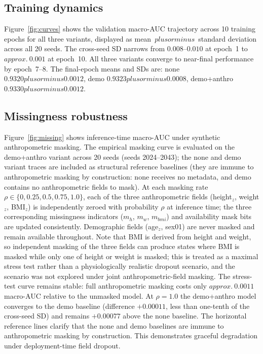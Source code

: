\documentclass[mathematics,article,pdftex]{Definitions/mdpi}
\def\texttt#1{#1}%
\def\mathrm#1{#1}%
\def\textbf#1{#1}%
\def\pm{plus or minus }%
\def\approx{approx.\ }%
\begin{document}
\subsection{Training dynamics}
Figure~\ref{fig:curves} shows the validation macro-AUC trajectory across 10 training epochs for all three variants, displayed as mean~$\pm$~standard deviation across all 20 seeds. The cross-seed SD narrows from $0.008$--$0.010$ at epoch~1 to ${\approx}0.001$ at epoch~10. All three variants converge to near-final performance by epoch~7--8. The final-epoch means and SDs are: \texttt{none} $0.9320\pm0.0012$, \texttt{demo} $0.9323\pm0.0008$, \texttt{demo+anthro} $0.9330\pm0.0012$.

\subsection{Missingness robustness}
Figure~\ref{fig:missing} shows inference-time macro-AUC under synthetic anthropometric masking. The empirical masking curve is evaluated on the \texttt{demo+anthro} variant across \textbf{20 seeds} (seeds 2024--2043); the \texttt{none} and \texttt{demo} variant traces are included as structural reference baselines (they are immune to anthropometric masking by construction: \texttt{none} receives no metadata, and \texttt{demo} contains no anthropometric fields to mask). At each masking rate $\rho \in \{0, 0.25, 0.5, 0.75, 1.0\}$, each of the three anthropometric fields (height$_z$, weight$_z$, BMI$_z$) is independently zeroed with probability $\rho$ at inference time; the three corresponding missingness indicators ($m_h$, $m_w$, $m_{\mathrm{bmi}}$) and availability mask bits are updated consistently. Demographic fields (age$_z$, sex01) are never masked and remain available throughout. Note that BMI is derived from height and weight, so independent masking of the three fields can produce states where BMI is masked while only one of height or weight is masked; this is treated as a maximal stress test rather than a physiologically realistic dropout scenario, and the scenario was not explored under joint anthropometric-field masking. The stress-test curve remains stable: full anthropometric masking costs only $\approx 0.0011$ macro-AUC relative to the unmasked model. At $\rho{=}1.0$ the \texttt{demo+anthro} model converges to the \texttt{demo} baseline (difference $+0.00011$, less than one-tenth of the cross-seed SD) and remains $+0.00077$ above the \texttt{none} baseline. The horizontal reference lines clarify that the \texttt{none} and \texttt{demo} baselines are immune to anthropometric masking by construction. This demonstrates graceful degradation under deployment-time field dropout.
\end{document}
